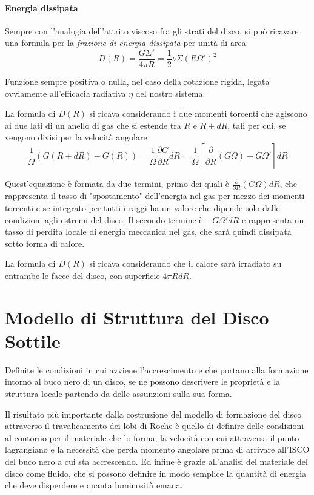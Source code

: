 \documentclass[a4paperbi]{article}
\begin{document}
	\paragraph{Energia dissipata}
	Sempre con l'analogia dell'attrito viscoso fra gli strati del disco, si può ricavare una formula per la \textit{frazione di energia dissipata} per unità di area:
	\begin{equation}
		D(R)=\frac{G\Sigma'}{4\pi R}=\frac{1}{2}\nu\Sigma(R\Omega')^2
	\end{equation}
	
	Funzione sempre positiva o nulla, nel caso della rotazione rigida, legata ovviamente all'efficacia radiativa $\eta$ del nostro sistema.
	
	La formula di $D(R)$ si ricava considerando i due momenti torcenti che agiscono ai due lati di un anello di gas che si estende tra $R$ e $R+dR$, tali per cui, se vengono divisi per la velocità angolare
	\begin{equation}
		\frac{1}{\Omega}(G(R+dR)-G(R))=\frac{1}{\Omega}\frac{\partial G}{\partial R}dR=\frac{1}{\Omega}\left[\frac{\partial}{\partial R}(G\Omega)-G\Omega'\right]dR
	\end{equation}
	
	Quest'equazione è formata da due termini, primo dei quali è $\frac{\partial}{\partial R}(G\Omega)dR$, che rappresenta il tasso di "spostamento" dell'energia nel gas per mezzo dei momenti torcenti e se integrato per tutti i raggi ha un valore che dipende solo dalle condizioni agli estremi del disco. Il secondo termine è $-G\Omega'dR$ e rappresenta un tasso di perdita locale di energia meccanica nel gas, che sarà quindi dissipata sotto forma di calore.
	
	La formula di $D(R)$ si ricava considerando che il calore sarà irradiato su entrambe le facce del disco, con superficie $4\pi RdR$.
	
\newpage
\section{Modello di Struttura del Disco Sottile}
	Definite le condizioni in cui avviene l'accrescimento e che portano alla formazione intorno al buco nero di un disco, se ne possono descrivere le proprietà e la struttura locale partendo da delle assunzioni sulla sua forma. 
	
	Il risultato più importante dalla costruzione del modello di formazione del disco attraverso il travalicamento dei lobi di Roche è quello di definire delle condizioni al contorno per il materiale che lo forma, la velocità con cui attraversa il punto lagrangiano e la necessità che perda momento angolare prima di arrivare all'ISCO del buco nero a cui sta accrescendo. Ed infine è grazie all'analisi del materiale del disco come fluido, che si possono definire in modo semplice la quantità di energia che deve disperdere e quanta luminosità emana.
\end{document}
